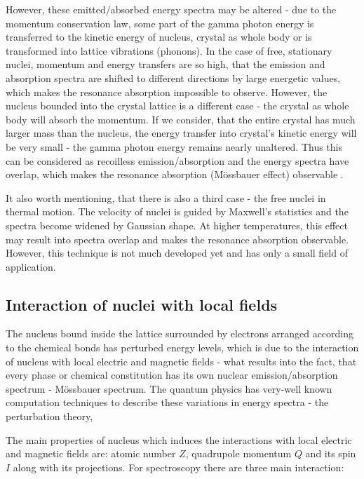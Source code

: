 \par
However, these emitted/absorbed energy spectra may be altered - due to the  momentum conservation law, some part of the gamma photon energy is transferred to the  kinetic energy of nucleus, crystal as whole body or is transformed into lattice vibrations (phonons). 
In the case of free, stationary nuclei, momentum and energy transfers are so high, that the emission and absorption spectra are shifted to different directions by large energetic values, which makes the resonance absorption impossible to observe. However, the nucleus bounded into the crystal lattice is a different case - the crystal as whole body will absorb the momentum. If we consider, that the entire crystal has much larger mass than the nucleus, the energy transfer into crystal's kinetic energy will be very small - the gamma photon energy remains nearly unaltered. Thus this can be considered as recoilless emission/absorption and the energy spectra have overlap, which makes the resonance absorption (Mössbauer effect) observable \cite{moss}.
\par
It also worth mentioning, that there is also a third case - the free nuclei in thermal motion. The velocity of nuclei is guided by Maxwell's statistics and the spectra become widened by Gaussian shape. At higher temperatures, this effect may result into spectra overlap and makes the resonance absorption observable. However, this technique is not much developed yet and has only a small field of application.

\subsection{Interaction of nuclei with local fields}

The nucleus bound inside the lattice surrounded by electrons arranged according to the chemical bonds has perturbed energy levels, which is due to the interaction of nucleus with local electric and magnetic fields -  what results into the fact, that every phase or chemical constitution has its own nuclear emission/absorption spectrum - Mössbauer spectrum. The quantum physics has very-well known computation techniques to describe these variations in energy spectra - the perturbation theory,

\par
The main properties of nucleus which induces the interactions with local electric and magnetic fields are: atomic number $Z$, quadrupole momentum $Q$ and its spin $I$ along with its projections. For spectroscopy there are three main interaction:

